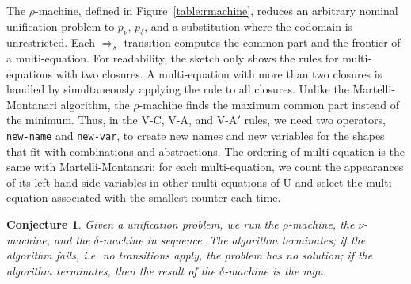 \documentclass{easychair}
\newtheorem{conj}{Conjecture}[section]
\newcommand*{\transname}[1]{\textsc{#1}}
\begin{document}
The $\rho$-machine, defined in
Figure~\ref{table:rmachine}, 
reduces an arbitrary nominal unification problem to
$p_\nu$, $p_\delta$, and a substitution where the codomain is unrestricted.
Each $\Rightarrow_s$ transition computes the common part and the frontier
of a multi-equation. For readability, the sketch only shows the rules
for multi-equations with two closures.
A multi-equation with more than two closures is handled by
simultaneously applying the rule to all closures.
Unlike the Martelli-Montanari algorithm,
the $\rho$-machine finds the maximum common part instead of the minimum.
Thus, in the \transname{V-C}, \transname{V-A}, and \transname{V-A$'$} rules,
we need two operators, \texttt{new-name} and \texttt{new-var},
to create new names and new variables
for the shapes that fit with combinations and abstractions.
The ordering of multi-equation is the same with Martelli-Montanari:
for each multi-equation, we count the appearances of its left-hand side
variables
in other multi-equations of U and select the multi-equation associated
with the smallest counter each time.
\begin{conj}\label{lemma:rmachine}
  Given a unification problem, we run the $\rho$-machine,
  the $\nu$-machine, and the $\delta$-machine in sequence.
  The algorithm terminates;
  if the algorithm fails, i.e. no transitions apply,
  the problem has no solution;
  if the algorithm terminates, then the result of the $\delta$-machine
  is the mgu.
\end{conj}
\end{document}

